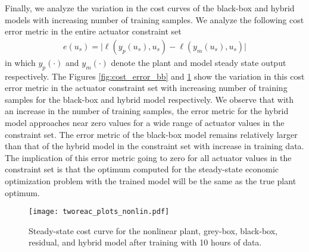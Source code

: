 \documentclass{article}
\begin{document}
Finally, we analyze the variation in the cost curves of the black-box and hybrid
models with increasing number of training samples. We analyze the following cost
error metric in the entire actuator constraint set
\begin{align*}
  e(u_s) = \vert \ell(y_p(u_s), u_s) - \ell(y_m(u_s), u_s) \vert
\end{align*}
in which $y_p(\cdot)$ and $y_m(\cdot)$ denote the plant and model steady state
output respectively. The Figures \ref{fig:cost_error_bb} and
\ref{fig:cost_error_hybrid} show the variation in this cost error metric in the
actuator constraint set with increasing number of training samples for the
black-box and hybrid model respectively. We observe that with an increase in the
number of training samples, the error metric for the hybrid model approaches
near zero values for a wide range of actuator values in the constraint set. The
error metric of the black-box model remains relatively larger than that of the
hybrid model in the constraint set with increase in training data. The
implication of this error metric going to zero for all actuator values in the
constraint set is that the optimum computed for the steady-state economic
optimization problem with the trained model will be the same as the true plant
optimum.

\begin{figure}[!h]
  \centering
  \texttt{[image: tworeac\_plots\_nonlin.pdf]}
  \caption{Steady-state cost curve for the nonlinear plant, grey-box, black-box,
  residual, and hybrid model after training with 10 hours of data.}
  \label{fig:cost_error_hybrid}
\end{figure}
\end{document}

